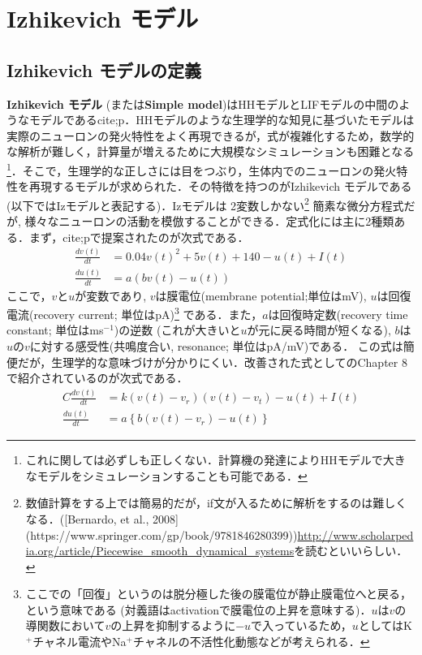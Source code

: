 \section{Izhikevich モデル}
\subsection{Izhikevich モデルの定義}
\textbf{Izhikevich モデル} (または\textbf{Simple model})はHHモデルとLIFモデルの中間のようなモデルである{cite;p}．HHモデルのような生理学的な知見に基づいたモデルは実際のニューロンの発火特性をよく再現できるが，式が複雑化するため，数学的な解析が難しく，計算量が増えるために大規模なシミュレーションも困難となる\footnote{これに関しては必ずしも正しくない．計算機の発達によりHHモデルで大きなモデルをシミュレーションすることも可能である．}．そこで，生理学的な正しさには目をつぶり，生体内でのニューロンの発火特性を再現するモデルが求められた．その特徴を持つのがIzhikevich モデルである (以下ではIzモデルと表記する)．Izモデルは 2変数しかない\footnote{数値計算をする上では簡易的だが，if文が入るために解析をするのは難しくなる．([Bernardo, et al., 2008](https://www.springer.com/gp/book/9781846280399))\url{http://www.scholarpedia.org/article/Piecewise_smooth_dynamical_systems}を読むといいらしい．}
簡素な微分方程式だが, 様々なニューロンの活動を模倣することができる\citep{Izhikevich2004-xf}．定式化には主に2種類ある．まず，{cite;p}で提案されたのが次式である．
\begin{align}
\frac{dv(t)}{dt}&=0.04v(t)^2 + 5v(t)+140-u(t)+I(t) \\
\frac{du(t)}{dt}&=a(bv(t)-u(t))
\end{align} 
ここで，$v$と$u$が変数であり, $v$は膜電位(membrane potential;単位はmV), $u$は回復電流(recovery current; 単位はpA)\footnote{ここでの「回復」というのは脱分極した後の膜電位が静止膜電位へと戻る，という意味である (対義語はactivationで膜電位の上昇を意味する)．$u$は$v$の導関数において$v$の上昇を抑制するように$-u$で入っているため，$u$としてはK$^+$チャネル電流やNa$^+$チャネルの不活性化動態などが考えられる．}
である．また，$a$は回復時定数(recovery time constant; 単位はms$^{-1}$)の逆数 (これが大きいと$u$が元に戻る時間が短くなる), $b$は$u$の$v$に対する感受性(共鳴度合い,  resonance; 単位はpA/mV)である．
この式は簡便だが，生理学的な意味づけが分かりにくい．改善された式として\citep{Izhikevich2007-ff}のChapter 8で紹介されているのが次式である．
\begin{align}
C\frac{dv(t)}{dt}&=k\left(v(t)-v_r\right)\left(v(t)-v_t\right)-u(t)+I(t) \\
\frac{du(t)}{dt}&=a\left\{b\left(v(t)-v_{r}\right)-u(t)\right\}
\end{align} 
